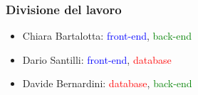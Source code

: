 \documentclass[hyperref={pdfpagelabels=false}]{beamer}
\begin{document}
\begin{frame}\frametitle{Divisione del lavoro}
\begin{itemize}
\item Chiara Bartalotta: \textcolor{blue}{front-end}, \textcolor{green}{back-end}
\item Dario Santilli: \textcolor{blue}{front-end}, \textcolor{red}{database}
\item Davide Bernardini:  \textcolor{red}{database}, \textcolor{green}{back-end}
\end{itemize}
\end{frame}
\end{document}
